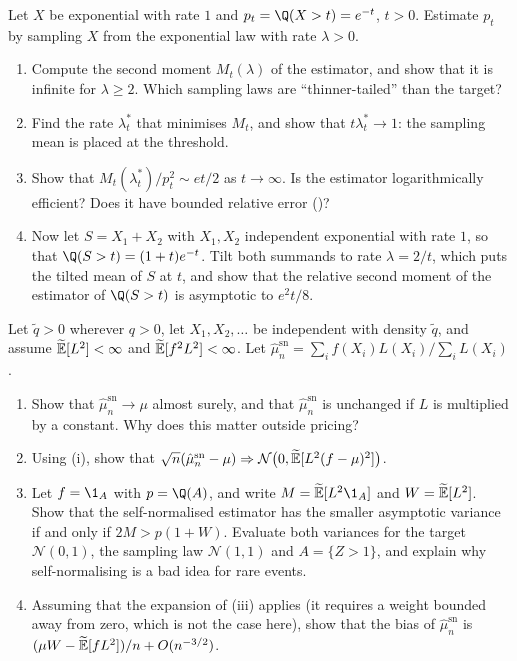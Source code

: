 \begin{exercise}\label{ex:is-exponential}
\medium Let $X$ be exponential with rate $1$ and $p_t=\Q(X>t)=e^{-t}$, $t>0$. Estimate $p_t$ by
sampling $X$ from the exponential law with rate $\lambda>0$.
\begin{enumerate}[label=(\alph*)]
  \item Compute the second moment $M_t(\lambda)$ of the estimator, and show that it is infinite for
    $\lambda\ge2$. Which sampling laws are ``thinner-tailed'' than the target?
  \item Find the rate $\lambda^*_t$ that minimises $M_t$, and show that $t\lambda_t^*\to1$: the
    sampling mean is placed at the threshold.
  \item Show that $M_t(\lambda^*_t)/p_t^2\sim et/2$ as $t\to\infty$. Is the estimator
    logarithmically efficient? Does it have bounded relative error ()?
  \item Now let $S=X_1+X_2$ with $X_1,X_2$ independent exponential with rate $1$, so that
    $\Q(S>t)=(1+t)e^{-t}$. Tilt both summands to rate $\lambda=2/t$, which puts the tilted
    mean of $S$ at $t$, and show that the relative second moment of the estimator of
    $\Q(S>t)$ is asymptotic to $e^2t/8$.
\end{enumerate}
\end{exercise}

\begin{exercise}\label{ex:is-self-normalized}
\medium Let $\tilde q>0$ wherever $q>0$, let $X_1,X_2,\dots$ be independent with density
$\tilde q$, and assume $\widetilde{\mathbb E}[L^2]<\infty$ and $\widetilde{\mathbb E}[f^2L^2]<\infty$. Let
$\hat\mu^{\mathrm{sn}}_n=\sum_if(X_i)L(X_i)/\sum_iL(X_i)$.
\begin{enumerate}[label=(\alph*)]
  \item Show that $\hat\mu^{\mathrm{sn}}_n\to\mu$ almost surely, and that $\hat\mu^{\mathrm{sn}}_n$
    is unchanged if $L$ is multiplied by a constant. Why does this matter outside pricing?
  \item Using (i), show that
    $\sqrt n(\hat\mu^{\mathrm{sn}}_n-\mu)\Rightarrow\mathcal N\big(0,\widetilde{\mathbb E}[L^2(f-\mu)^2]\big)$.
  \item Let $f=\1_A$ with $p=\Q(A)$, and write $M=\Et[L^2\1_A]$ and $W=\widetilde{\mathbb E}[L^2]$. Show that the
    self-normalised estimator has the smaller asymptotic variance if and only if $2M>p(1+W)$.
    Evaluate both variances for the target $\mathcal N(0,1)$, the sampling law $\mathcal N(1,1)$
    and $A=\{Z>1\}$, and explain why self-normalising is a bad idea for rare events.
  \item Assuming that the expansion of (iii) applies (it requires a weight
    bounded away from zero, which is not the case here), show that the bias of
    $\hat\mu^{\mathrm{sn}}_n$ is $(\mu W-\widetilde{\mathbb E}[fL^2])/n+O(n^{-3/2})$.
\end{enumerate}
\end{exercise}

